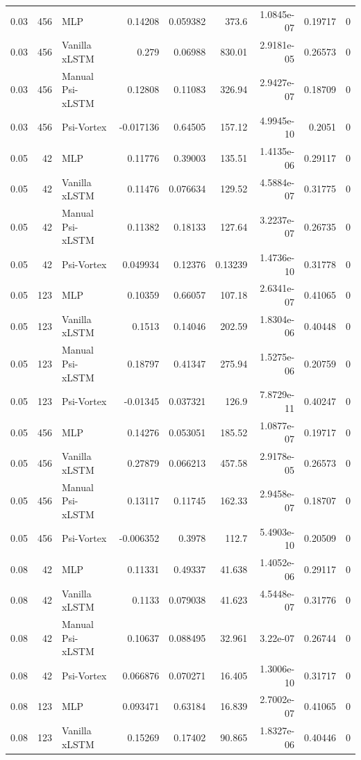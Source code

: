 \begin{tabular}{rrlrrrrrr}
0.03 & 456 & MLP & 0.14208 & 0.059382 & 373.6 & 1.0845e-07 & 0.19717 & 0 \\
0.03 & 456 & Vanilla xLSTM & 0.279 & 0.06988 & 830.01 & 2.9181e-05 & 0.26573 & 0 \\
0.03 & 456 & Manual Psi-xLSTM & 0.12808 & 0.11083 & 326.94 & 2.9427e-07 & 0.18709 & 0 \\
0.03 & 456 & Psi-Vortex & -0.017136 & 0.64505 & 157.12 & 4.9945e-10 & 0.2051 & 0 \\
0.05 & 42 & MLP & 0.11776 & 0.39003 & 135.51 & 1.4135e-06 & 0.29117 & 0 \\
0.05 & 42 & Vanilla xLSTM & 0.11476 & 0.076634 & 129.52 & 4.5884e-07 & 0.31775 & 0 \\
0.05 & 42 & Manual Psi-xLSTM & 0.11382 & 0.18133 & 127.64 & 3.2237e-07 & 0.26735 & 0 \\
0.05 & 42 & Psi-Vortex & 0.049934 & 0.12376 & 0.13239 & 1.4736e-10 & 0.31778 & 0 \\
0.05 & 123 & MLP & 0.10359 & 0.66057 & 107.18 & 2.6341e-07 & 0.41065 & 0 \\
0.05 & 123 & Vanilla xLSTM & 0.1513 & 0.14046 & 202.59 & 1.8304e-06 & 0.40448 & 0 \\
0.05 & 123 & Manual Psi-xLSTM & 0.18797 & 0.41347 & 275.94 & 1.5275e-06 & 0.20759 & 0 \\
0.05 & 123 & Psi-Vortex & -0.01345 & 0.037321 & 126.9 & 7.8729e-11 & 0.40247 & 0 \\
0.05 & 456 & MLP & 0.14276 & 0.053051 & 185.52 & 1.0877e-07 & 0.19717 & 0 \\
0.05 & 456 & Vanilla xLSTM & 0.27879 & 0.066213 & 457.58 & 2.9178e-05 & 0.26573 & 0 \\
0.05 & 456 & Manual Psi-xLSTM & 0.13117 & 0.11745 & 162.33 & 2.9458e-07 & 0.18707 & 0 \\
0.05 & 456 & Psi-Vortex & -0.006352 & 0.3978 & 112.7 & 5.4903e-10 & 0.20509 & 0 \\
0.08 & 42 & MLP & 0.11331 & 0.49337 & 41.638 & 1.4052e-06 & 0.29117 & 0 \\
0.08 & 42 & Vanilla xLSTM & 0.1133 & 0.079038 & 41.623 & 4.5448e-07 & 0.31776 & 0 \\
0.08 & 42 & Manual Psi-xLSTM & 0.10637 & 0.088495 & 32.961 & 3.22e-07 & 0.26744 & 0 \\
0.08 & 42 & Psi-Vortex & 0.066876 & 0.070271 & 16.405 & 1.3006e-10 & 0.31717 & 0 \\
0.08 & 123 & MLP & 0.093471 & 0.63184 & 16.839 & 2.7002e-07 & 0.41065 & 0 \\
0.08 & 123 & Vanilla xLSTM & 0.15269 & 0.17402 & 90.865 & 1.8327e-06 & 0.40446 & 0 \\

\end{tabular}
